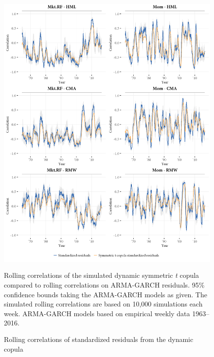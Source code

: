 \begin{figure}[p]
  \centering
  \includegraphics[width=\textwidth]{graphics/rolling_simulated1.png}
  \footnotesize
  \caption{Rolling correlations of standardized residuals from the dynamic copula}

  \begin{longcaption}
    Rolling correlations of the simulated dynamic symmetric \textit{t} copula compared to rolling correlations on ARMA-GARCH residuals. 95\% confidence bounds taking the ARMA-GARCH models as given. The simulated rolling correlations are based on 10,000 simulations each week. ARMA-GARCH models based on empirical weekly data 1963--2016.
  \end{longcaption}
  \label{fig:rolling_simulated}
\end{figure}
